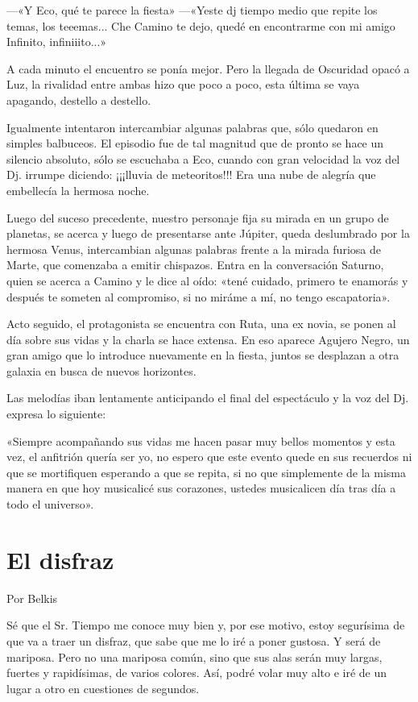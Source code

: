 \documentclass[11pt,twoside,openright,a5paper]{book}
\begin{document}
---«Y Eco, qué te parece la fiesta» 
---«Yeste dj tiempo medio que repite los temas, los teeemas... Che Camino te dejo, quedé en encontrarme con mi amigo Infinito, infiniiito...»

A cada minuto el encuentro se ponía mejor. Pero la llegada de Oscuridad opacó a Luz, la rivalidad entre ambas hizo que poco a poco, esta última se vaya apagando, destello a destello. 

Igualmente intentaron intercambiar algunas palabras que, sólo quedaron en simples balbuceos. El episodio fue de tal magnitud que de pronto se hace un silencio absoluto, sólo se escuchaba a Eco, cuando con gran velocidad la voz del Dj. irrumpe diciendo: ¡¡¡lluvia de meteoritos!!! Era una nube de alegría que embellecía la hermosa noche.

Luego del suceso precedente, nuestro personaje fija su mirada en un grupo de planetas, se acerca y luego de presentarse ante Júpiter, queda deslumbrado por la hermosa Venus, intercambian algunas palabras frente a la mirada furiosa de Marte, que comenzaba a emitir chispazos. Entra en la conversación Saturno, quien se acerca a Camino y le dice al oído: «tené cuidado, primero te enamorás y después te someten al compromiso, si no miráme a mí, no tengo escapatoria».

Acto seguido, el protagonista se encuentra con Ruta, una ex novia, se ponen al día sobre sus vidas y la charla se hace extensa. En eso aparece Agujero Negro, un gran amigo que lo introduce nuevamente en la fiesta, juntos se desplazan a otra galaxia en busca de nuevos horizontes.

Las melodías iban lentamente anticipando el final del espectáculo y la voz del Dj. expresa lo siguiente:

«Siempre acompañando sus vidas me hacen pasar muy bellos momentos y esta vez, el anfitrión quería ser yo, no espero que este evento quede en sus recuerdos ni que se mortifiquen esperando a que se repita, si no que simplemente de la misma manera en que hoy musicalicé sus corazones, ustedes musicalicen día tras día a todo el universo».

\section*{El disfraz}

\begin{flushright}Por Belkis\end{flushright}

Sé que el Sr. Tiempo me conoce muy bien y, por ese motivo, estoy segurísima de que va a traer un disfraz, que sabe que me lo iré a poner gustosa. Y será de mariposa. Pero no una mariposa común, sino que sus alas serán muy largas, fuertes y rapidísimas, de varios colores. Así, podré volar muy alto e iré de un lugar a otro en cuestiones de segundos. 
\end{document}

